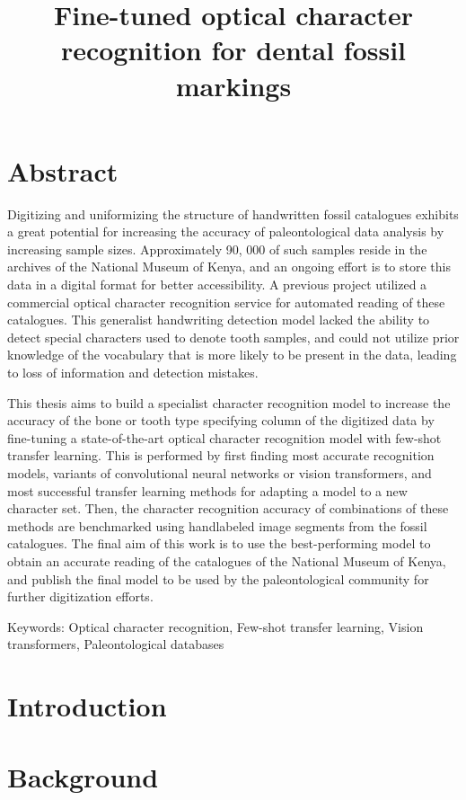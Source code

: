 \documentclass{article}
\title{Fine-tuned optical character recognition for dental fossil markings}
\begin{document}
\tableofcontents

\section{Abstract}

Digitizing and uniformizing the structure of handwritten fossil catalogues exhibits a great 
potential for increasing the accuracy of paleontological data analysis by increasing sample sizes. 
Approximately 90, 000 of such samples reside in the archives of the National Museum of Kenya, and 
an ongoing effort is to store this data in a digital format for better accessibility.
A previous project utilized a commercial optical character recognition service for automated reading of these catalogues. This generalist
handwriting detection model lacked the ability to detect special characters used to denote tooth samples, and could not utilize prior knowledge 
of the vocabulary that is more likely to be present in the data, leading to loss of information and detection mistakes.

This thesis aims to build a specialist character recognition model to increase the accuracy of 
the bone or tooth type specifying column of the digitized data by fine-tuning a state-of-the-art optical 
character recognition model with few-shot transfer learning. This is performed by first finding most accurate
recognition models, variants of convolutional neural networks or vision transformers, and most successful 
transfer learning methods for adapting a model to a new character set. Then, the character 
recognition accuracy of combinations of these methods are benchmarked using handlabeled image segments from the 
fossil catalogues. The final aim of this work is to use the best-performing model 
to obtain an accurate reading of the catalogues of the National Museum of Kenya, and publish the final model to be used 
by the paleontological community for further digitization efforts.

Keywords: Optical character recognition, Few-shot transfer learning, Vision transformers, Paleontological databases

\section{Introduction}



\section{Background}
\end{document}
